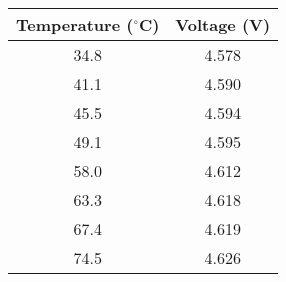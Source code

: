    \begin{tabular}{|c|c|} 
        \hline
        \textbf{Temperature ($^{\circ}$C)} & \textbf{Voltage (V)} \\
        \hline
        34.8 & 4.578 \\
        \hline
        41.1 & 4.590 \\
        \hline
        45.5 & 4.594 \\
        \hline
        49.1 & 4.595 \\
        \hline
        58.0 & 4.612 \\
        \hline
        63.3 & 4.618 \\
        \hline
        67.4 & 4.619 \\
        \hline
        74.5 & 4.626 \\
        \hline
    \end{tabular}
